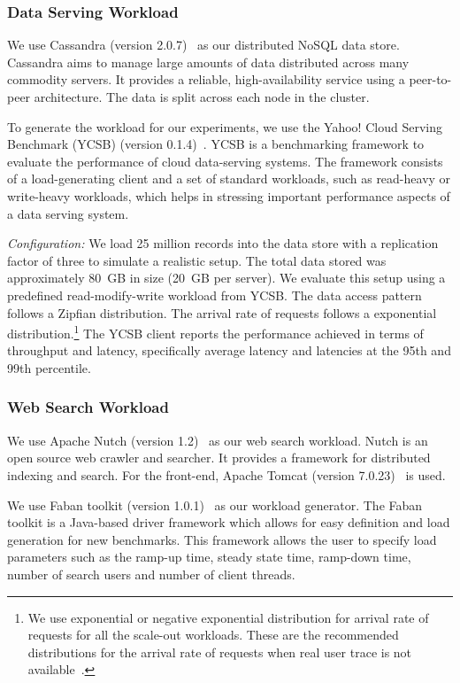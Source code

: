 \documentclass{sig-alternate}
\begin{document}
\subsubsection{Data Serving Workload}

We use Cassandra (version 2.0.7)~\cite{cassandra_paper,cassandraweb} as our
distributed NoSQL data store. Cassandra aims to manage large amounts
of data distributed across many commodity servers. It provides a
reliable, high-availability service using a peer-to-peer
architecture. The data is split across each node in the cluster. 

To generate the workload for our experiments, we use the Yahoo! Cloud
Serving Benchmark (YCSB) (version 0.1.4)~\cite{ycsb}. YCSB is a benchmarking framework to evaluate the
performance of cloud data-serving systems. The framework consists of a
load-generating client and a set of standard workloads, such as
read-heavy or write-heavy workloads, which helps in stressing
important performance aspects of a data serving system.

\emph{Configuration:} We load 25 million records into the data store with
a replication factor of three to simulate a realistic setup. The total data stored was 
approximately 80~GB in size (20~GB per server). We evaluate this setup 
using a predefined read-modify-write workload from YCSB. 
The data access pattern follows a Zipfian distribution. The arrival rate of requests follows a 
exponential distribution.\footnote{We use exponential or negative exponential distribution for 
arrival rate of requests for all the scale-out workloads. These are the recommended distributions 
for the arrival rate of requests when real user trace is not available~\cite{oldi}.} The YCSB client reports 
the performance achieved in terms of throughput and latency, 
specifically average latency and latencies at the 95th and 99th percentile. 

\subsubsection{Web Search Workload}

We use Apache Nutch (version 1.2)~\cite{nutchweb} as our web search workload. Nutch is an open source 
web crawler and searcher. It provides a framework for distributed indexing and 
search. For the front-end, Apache Tomcat (version 7.0.23)~\cite{tomcatweb} is used. 

We use Faban toolkit (version 1.0.1)~\cite{faban} as our workload generator. The Faban 
toolkit is a Java-based driver framework which allows for easy definition 
and load generation for new benchmarks. This framework allows the user to 
specify load parameters such as the ramp-up time, steady state time, 
ramp-down time, number of search users and number of client threads. 
\end{document}
